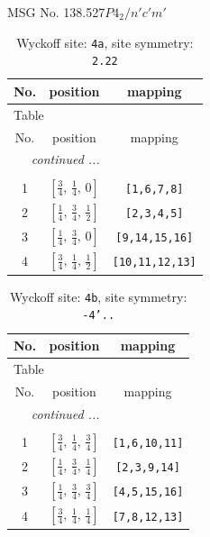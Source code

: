 \documentclass[fleqn,8pt]{jsarticle}
\begin{document}
\setcounter{MaxMatrixCols}{32}

\renewcommand{\tablename}{Table~}
\renewcommand{\figurename}{Figure~}
\begin{center}
\LARGE
MSG No. 138.527\quad$P4_{2}/n'c'm'$
\end{center}
\renewcommand{\arraystretch}{1.2}
\begin{longtable}{ccc}
\caption{Wyckoff site: {\tt 4a}, site symmetry: {\tt 2.22}}
 \\
 \hline \hline
No. & position & mapping \\ \hline \endfirsthead

\multicolumn{2}{l}{\tablename\ \thetable{}} \\
 \hline \hline
No. & position & mapping \\ \hline \endhead

 \hline \hline
\multicolumn{2}{r}{\footnotesize\it continued ...} \\ \endfoot

 \hline \hline
\multicolumn{2}{r}{} \\ \endlastfoot

1 & $\left[ \frac{3}{4},\, \frac{1}{4},\, 0 \right]$ & {\tt [1,6,7,8]} \\ \hline
2 & $\left[ \frac{1}{4},\, \frac{3}{4},\, \frac{1}{2} \right]$ & {\tt [2,3,4,5]} \\ \hline
3 & $\left[ \frac{1}{4},\, \frac{3}{4},\, 0 \right]$ & {\tt [9,14,15,16]} \\ \hline
4 & $\left[ \frac{3}{4},\, \frac{1}{4},\, \frac{1}{2} \right]$ & {\tt [10,11,12,13]} \\
\end{longtable}
\renewcommand{\arraystretch}{1.2}
\begin{longtable}{ccc}
\caption{Wyckoff site: {\tt 4b}, site symmetry: {\tt -4'..}}
 \\
 \hline \hline
No. & position & mapping \\ \hline \endfirsthead

\multicolumn{2}{l}{\tablename\ \thetable{}} \\
 \hline \hline
No. & position & mapping \\ \hline \endhead

 \hline \hline
\multicolumn{2}{r}{\footnotesize\it continued ...} \\ \endfoot

 \hline \hline
\multicolumn{2}{r}{} \\ \endlastfoot

1 & $\left[ \frac{3}{4},\, \frac{1}{4},\, \frac{3}{4} \right]$ & {\tt [1,6,10,11]} \\ \hline
2 & $\left[ \frac{1}{4},\, \frac{3}{4},\, \frac{1}{4} \right]$ & {\tt [2,3,9,14]} \\ \hline
3 & $\left[ \frac{1}{4},\, \frac{3}{4},\, \frac{3}{4} \right]$ & {\tt [4,5,15,16]} \\ \hline
4 & $\left[ \frac{3}{4},\, \frac{1}{4},\, \frac{1}{4} \right]$ & {\tt [7,8,12,13]} \\
\end{longtable}
\end{document}
